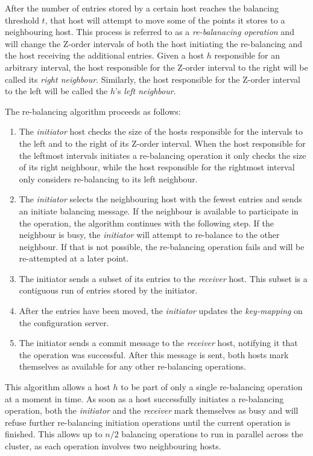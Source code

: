 \documentclass[11pt,a4paper]{globis-book}
\begin{document}
After the number of entries stored by a certain host reaches the balancing threshold $t$, that host will attempt to move some of the points it stores to a neighbouring host. This process is referred to as a \textit{re-balanacing operation} and will change the Z-order intervals of both the host initiating the re-balancing and the host receiving the additional entries.
Given a host $h$ responsible for an arbitrary interval, the host responsible for the Z-order interval to the right will be called its \textit{right neighbour}. Similarly, the host responsible for the Z-order interval to the left will be called the $h$'s \textit{left neighbour}. 

The re-balancing algorithm proceeds as follows: 
\begin{enumerate}
    \item The \textit{initiator} host checks the size of the hosts responsible for the intervals to the left and to the right of its Z-order interval. When the host responsible for the leftmost intervals initiates a re-balancing operation it only checks the size of its right neighbour, while the host responsible for the rightmost interval only considers re-balancing to its left neighbour.
    \item The \textit{initiator} selects the neighbouring host with the fewest entries and sends an initiate balancing message. If the neighbour is available to participate in the operation, the algorithm continues with the following step. If the neighbour is busy, the \textit{initiator} will attempt to re-balance to the other neighbour. If that is not possible, the re-balancing operation fails and will be re-attempted at a later point.
    \item The initiator sends a subset of its entries to the \textit{receiver} host. This subset is a contiguous run of entries stored by the initiator.
    \item After the entries have been moved, the \textit{initiator} updates the \textit{key-mapping} on the configuration server. 
    \item The initiator sends a commit message to the \textit{receiver} host, notifying it that the operation was successful. After this message is sent, both hosts mark themselves as available for any other re-balancing operations.
\end{enumerate}

This algorithm allows a host $h$ to be part of only a single re-balancing operation at a moment in time. As soon as a host successfully initiates a re-balancing operation, both the \textit{initiator} and the \textit{receiver} mark themselves as busy and will refuse further re-balancing initiation operations until the current operation is finished. This allows up to $n/2$ balancing operations to run in parallel across the cluster, as each operation involves two neighbouring hosts.
\end{document}
